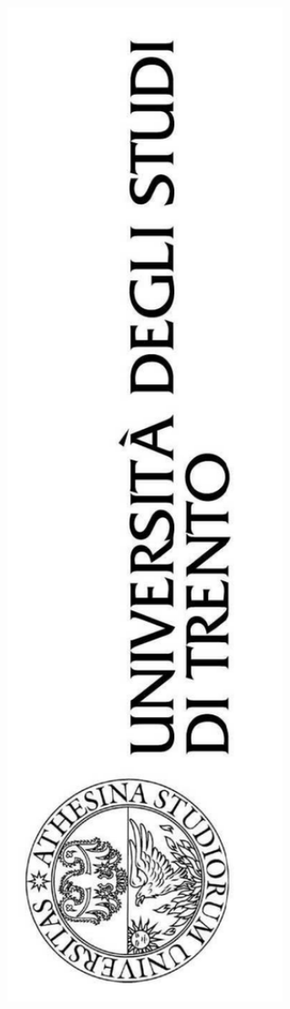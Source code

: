 \documentclass[12pt]{article}
\begin{document}
\begin{titlepage}
	\centering
	\begin{figure}[ht]
		\centering
		\includegraphics[angle=-90, keepaspectratio=true, width=8cm]{logo}

\end{figure}
\end{titlepage}
\end{document}
